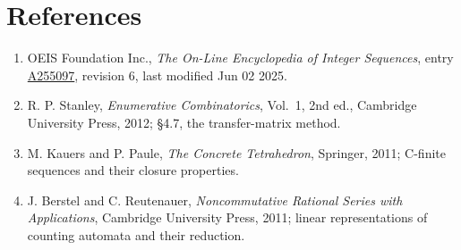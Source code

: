 \documentclass[11pt]{article}
\theoremstyle{definition}
\begin{document}
\section{References}

\begin{enumerate}

\item OEIS Foundation Inc., \emph{The On-Line Encyclopedia of Integer Sequences}, entry \href{https://oeis.org/A255097}{A255097}, revision 6, last modified Jun 02 2025.

\item R. P. Stanley, \emph{Enumerative Combinatorics}, Vol.~1, 2nd ed., Cambridge University Press, 2012; \S4.7, the transfer-matrix method.

\item M. Kauers and P. Paule, \emph{The Concrete Tetrahedron}, Springer, 2011; C-finite sequences and their closure properties.

\item J. Berstel and C. Reutenauer, \emph{Noncommutative Rational Series with Applications}, Cambridge University Press, 2011; linear representations of counting automata and their reduction.

\end{enumerate}
\end{document}

